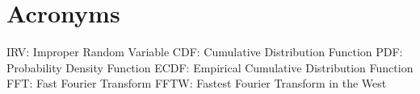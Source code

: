 \section{Acronyms}
    IRV: Improper Random Variable
    CDF: Cumulative Distribution Function
    PDF: Probability Density Function
    ECDF: Empirical Cumulative Distribution Function
    FFT: Fast Fourier Transform
    FFTW: Fastest Fourier Transform in the West

